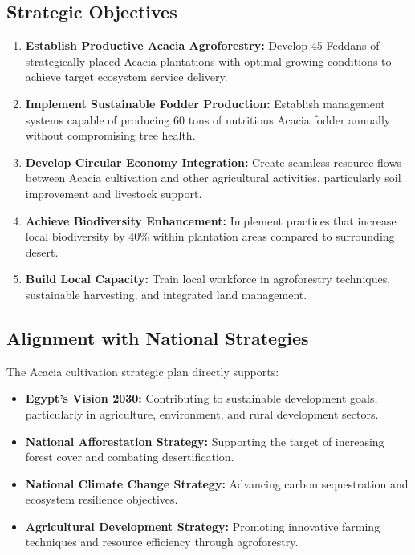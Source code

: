 \subsection{Strategic Objectives}

\begin{enumerate}
    \item \textbf{Establish Productive Acacia Agroforestry:} Develop 45 Feddans of strategically placed Acacia plantations with optimal growing conditions to achieve target ecosystem service delivery.
    
    \item \textbf{Implement Sustainable Fodder Production:} Establish management systems capable of producing 60 tons of nutritious Acacia fodder annually without compromising tree health.
    
    \item \textbf{Develop Circular Economy Integration:} Create seamless resource flows between Acacia cultivation and other agricultural activities, particularly soil improvement and livestock support.
    
    \item \textbf{Achieve Biodiversity Enhancement:} Implement practices that increase local biodiversity by 40\% within plantation areas compared to surrounding desert.
    
    \item \textbf{Build Local Capacity:} Train local workforce in agroforestry techniques, sustainable harvesting, and integrated land management.
\end{enumerate}

\subsection{Alignment with National Strategies}

The Acacia cultivation strategic plan directly supports:

\begin{itemize}
    \item \textbf{Egypt's Vision 2030:} Contributing to sustainable development goals, particularly in agriculture, environment, and rural development sectors.
    
    \item \textbf{National Afforestation Strategy:} Supporting the target of increasing forest cover and combating desertification.
    
    \item \textbf{National Climate Change Strategy:} Advancing carbon sequestration and ecosystem resilience objectives.
    
    \item \textbf{Agricultural Development Strategy:} Promoting innovative farming techniques and resource efficiency through agroforestry.
\end{itemize}

